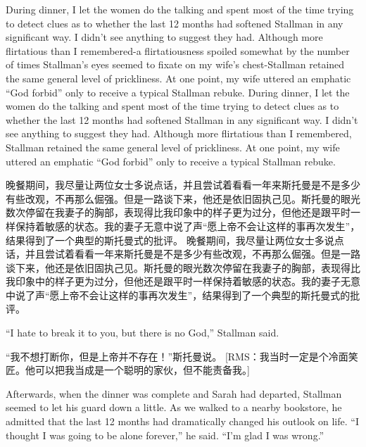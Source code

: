 \ifdefined\eng
\ifdefined\vone
During dinner, I let the women do the talking and spent most of the time trying to detect clues as to whether the last 12 months had softened Stallman in any significant way. I didn't see anything to suggest they had. Although more flirtatious than I remembered-a flirtatiousness spoiled somewhat by the number of times Stallman's eyes seemed to fixate on my wife's chest-Stallman retained the same general level of prickliness. At one point, my wife uttered an emphatic ``God forbid'' only to receive a typical Stallman rebuke.
\fi
\ifdefined\vtwo
During dinner, I let the women do the talking and spent most of the time trying to detect clues as to whether the last 12 months had softened Stallman in any significant way. I didn't see anything to suggest they had. Although more flirtatious than I remembered, Stallman retained the same general level of prickliness. At one point, my wife uttered an emphatic ``God forbid'' only to receive a typical Stallman rebuke.
\fi
\fi

\ifdefined\chs
\ifdefined\vone
晚餐期间，我尽量让两位女士多说点话，并且尝试着看看一年来斯托曼是不是多少有些改观，不再那么倔强。但是一路谈下来，他还是依旧固执己见。斯托曼的眼光数次停留在我妻子的胸部，表现得比我印象中的样子更为过分，但他还是跟平时一样保持着敏感的状态。我的妻子无意中说了声``愿上帝不会让这样的事再次发生''，结果得到了一个典型的斯托曼式的批评。
\fi
\ifdefined\vtwo
晚餐期间，我尽量让两位女士多说点话，并且尝试着看看一年来斯托曼是不是多少有些改观，不再那么倔强。但是一路谈下来，他还是依旧固执己见。斯托曼的眼光数次停留在我妻子的胸部，表现得比我印象中的样子更为过分，但他还是跟平时一样保持着敏感的状态。我的妻子无意中说了声``愿上帝不会让这样的事再次发生''，结果得到了一个典型的斯托曼式的批评。
\fi
\fi

\ifdefined\eng
``I hate to break it to you, but there is no God,'' Stallman said.
\ifdefined{}
\fi
\fi

\ifdefined\chs
``我不想打断你，但是上帝并不存在！''斯托曼说。
\ifdefined\vtwo
[RMS：我当时一定是个冷面笑匠。他可以把我当成是一个聪明的家伙，但不能责备我。]
\fi
\fi

\ifdefined\eng
Afterwards, when the dinner was complete and Sarah had departed, Stallman seemed to let his guard down a little. As we walked to a nearby bookstore, he admitted that the last 12 months had dramatically changed his outlook on life. ``I thought I was going to be alone forever,'' he said. ``I'm glad I was wrong.''
\fi


